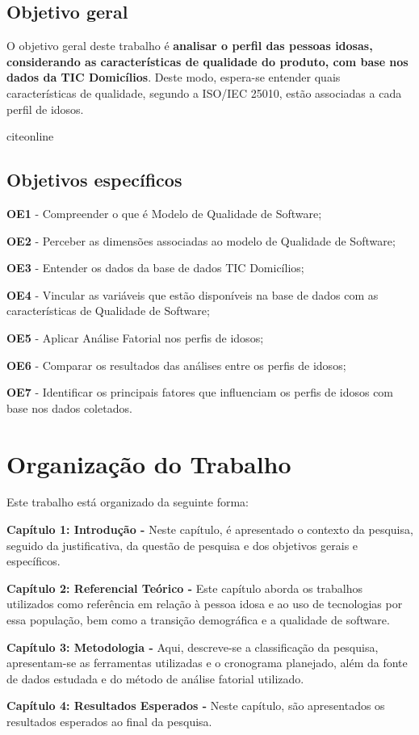 \subsection{Objetivo geral}
O objetivo geral deste trabalho é \textbf{analisar o perfil das pessoas idosas, considerando as características de qualidade do produto, com base nos dados da TIC Domicílios}. Deste modo, espera-se entender quais características de qualidade, segundo a ISO/IEC 25010, estão associadas a cada perfil de idosos.

citeonline\subsection{Objetivos específicos}
\textbf{OE1} - Compreender o que é Modelo de Qualidade de Software;

\textbf{OE2} - Perceber as dimensões associadas ao modelo de Qualidade de Software;

\textbf{OE3} - Entender os dados da base de dados TIC Domicílios;

\textbf{OE4} - Vincular as variáveis que estão disponíveis na base de dados com as características de Qualidade de Software;

\textbf{OE5} - Aplicar Análise Fatorial nos perfis de idosos;

\textbf{OE6} - Comparar os resultados das análises entre os perfis de idosos;

\textbf{OE7} - Identificar os principais fatores que influenciam os perfis de idosos com base nos dados coletados.

\section{Organização do Trabalho}

Este trabalho está organizado da seguinte forma:

\textbf{Capítulo 1: Introdução -} Neste capítulo, é apresentado o contexto da pesquisa, seguido da justificativa, da questão de pesquisa e dos objetivos gerais e específicos.

\textbf{Capítulo 2: Referencial Teórico -} Este capítulo aborda os trabalhos utilizados como referência em relação à pessoa idosa e ao uso de tecnologias por essa população, bem como a transição demográfica e a qualidade de software.

\textbf{Capítulo 3: Metodologia -} Aqui, descreve-se a classificação da pesquisa, apresentam-se as ferramentas utilizadas e o cronograma planejado, além da fonte de dados estudada e do método de análise fatorial utilizado.

\textbf{Capítulo 4:  Resultados Esperados -} Neste capítulo, são apresentados os resultados esperados ao final da pesquisa.
